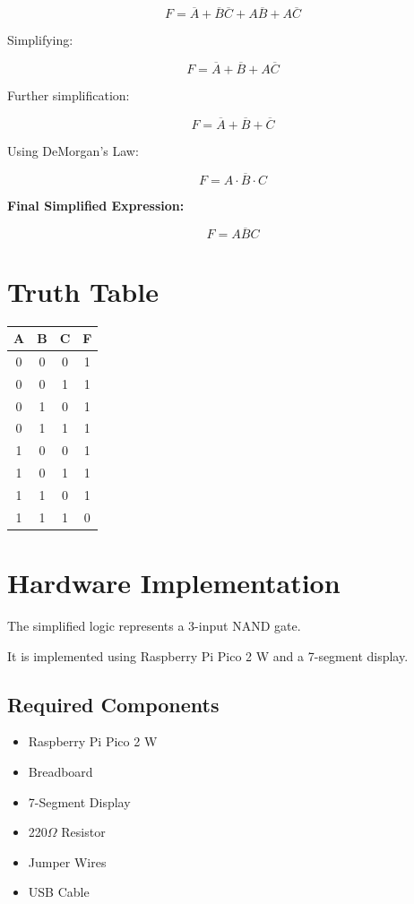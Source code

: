 \documentclass[12pt,a4paper]{article}
\begin{document}
\[
F = \overline{A} + \overline{B}\overline{C} + A\overline{B} + A\overline{C}
\]

Simplifying:

\[
F = \overline{A} + \overline{B} + A\overline{C}
\]

Further simplification:

\[
F = \overline{A} + \overline{B} + \overline{C}
\]

Using DeMorgan's Law:

\[
F = \overline{A \cdot B \cdot C}
\]

\textbf{Final Simplified Expression:}

\[
\boxed{F = \overline{ABC}}
\]

\section*{Truth Table}

\begin{center}
\begin{tabular}{|c|c|c|c|}
\hline
A & B & C & F \\
\hline
0 & 0 & 0 & 1 \\
0 & 0 & 1 & 1 \\
0 & 1 & 0 & 1 \\
0 & 1 & 1 & 1 \\
1 & 0 & 0 & 1 \\
1 & 0 & 1 & 1 \\
1 & 1 & 0 & 1 \\
1 & 1 & 1 & 0 \\
\hline
\end{tabular}
\end{center}

\section*{Hardware Implementation}

The simplified logic represents a 3-input NAND gate.

It is implemented using Raspberry Pi Pico 2 W and a 7-segment display.

\subsection*{Required Components}

\begin{itemize}
    \item Raspberry Pi Pico 2 W
    \item Breadboard
    \item 7-Segment Display
    \item 220$\Omega$ Resistor
    \item Jumper Wires
    \item USB Cable
\end{itemize}
\end{document}

